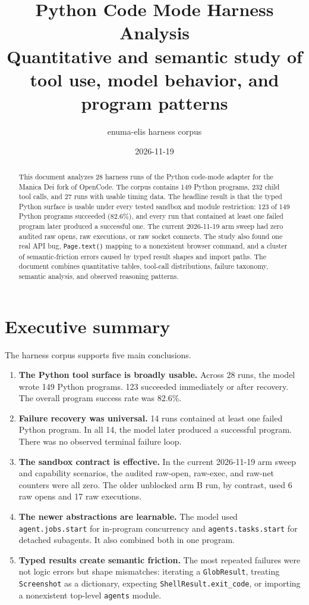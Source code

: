 \documentclass[11pt]{article}
\title{\bfseries Python Code Mode Harness Analysis\\
\large Quantitative and semantic study of tool use, model behavior, and program patterns}
\author{enuma-elis harness corpus}
\date{2026-11-19}
\newcommand{\code}[1]{\texttt{#1}}
\begin{document}
\maketitle

\begin{abstract}
This document analyzes 28 harness runs of the Python code-mode adapter for the
Manica Dei fork of OpenCode.  The corpus contains 149 Python programs, 232 child
tool calls, and 27 runs with usable timing data.  The headline result is that
the typed Python surface is usable under every tested sandbox and module
restriction: 123 of 149 Python programs succeeded (82.6\%), and every run that
contained at least one failed program later produced a successful one.  The
current 2026-11-19 arm sweep had zero audited raw opens, raw executions, or raw
socket connects.  The study also found one real API bug, \code{Page.text()}
mapping to a nonexistent browser command, and a cluster of semantic-friction
errors caused by typed result shapes and import paths.  The document combines
quantitative tables, tool-call distributions, failure taxonomy, semantic
analysis, and observed reasoning patterns.
\end{abstract}

\tableofcontents
\newpage

\section{Executive summary}

The harness corpus supports five main conclusions.

\begin{enumerate}[leftmargin=1.5em]
\item \textbf{The Python tool surface is broadly usable.}  Across 28 runs, the
model wrote 149 Python programs.  123 succeeded immediately or after recovery.
The overall program success rate was 82.6\%.

\item \textbf{Failure recovery was universal.}  14 runs contained at least one
failed Python program.  In all 14, the model later produced a successful
program.  There was no observed terminal failure loop.

\item \textbf{The sandbox contract is effective.}  In the current 2026-11-19
arm sweep and capability scenarios, the audited raw-open, raw-exec, and raw-net
counters were all zero.  The older unblocked arm B run, by contrast, used 6 raw
opens and 17 raw executions.

\item \textbf{The newer abstractions are learnable.}  The model used
\code{agent.jobs.start} for in-program concurrency and
\code{agents.tasks.start} for detached subagents.  It also combined both in one
program.

\item \textbf{Typed results create semantic friction.}  The most repeated
failures were not logic errors but shape mismatches: iterating a
\code{GlobResult}, treating \code{Screenshot} as a dictionary, expecting
\code{ShellResult.exit\_code}, or importing a nonexistent top-level
\code{agents} module.
\end{enumerate}
\end{document}
